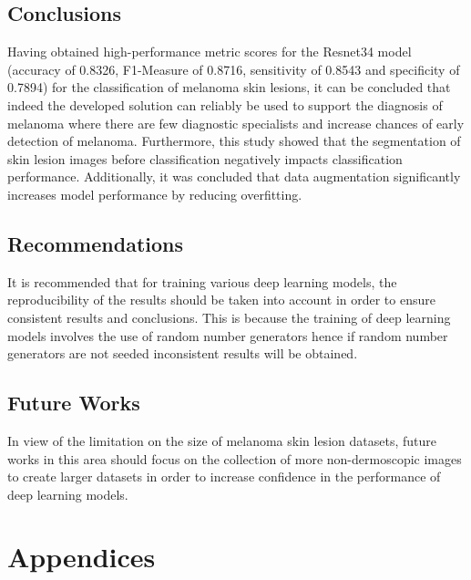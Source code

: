 \documentclass[12pt, a4paper]{article}
\begin{document}
\subsection{Conclusions}
Having obtained high-performance metric scores for the Resnet34 model (accuracy of 0.8326, F1-Measure of 0.8716, sensitivity of 0.8543 and specificity of 0.7894) for the classification of melanoma skin lesions, it can be concluded that indeed the developed solution can reliably be used to support the diagnosis of melanoma where there are few diagnostic specialists and increase chances of early detection of melanoma. Furthermore, this study showed that the segmentation of skin lesion images before classification negatively impacts classification performance. Additionally, it was concluded that data augmentation significantly increases model performance by reducing overfitting.
\subsection{Recommendations}
It is recommended that for training various deep learning models, the reproducibility of the results should be taken into account in order to ensure consistent results and conclusions. This is because the training of deep learning models involves the use of random number generators hence if random number generators are not seeded inconsistent results will be obtained.
\subsection{Future Works}
In view of the limitation on the size of melanoma skin lesion datasets, future works in this area should focus on the collection of more non-dermoscopic images to create larger datasets in order to increase confidence in the performance of deep learning models.
\clearpage


\clearpage
\section*{Appendices}
\captionsetup[figure]{list=no}
\end{document}
